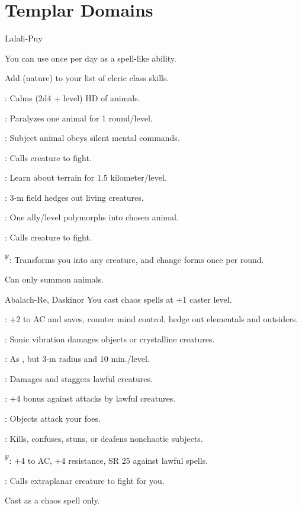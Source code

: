 \section{Templar Domains}

{Lalali-Puy}
{You can use  once per day as a spell-like ability.

Add  (nature) to your list of cleric class skills.}
{
	\item {}: Calms (2d4 + level) HD of animals.
	\item {}: Paralyzes one animal for 1 round/level.
	\item {}: Subject animal obeys silent mental commands.
	\item {}\footnotemark[1]: Calls creature to fight.
	\item {}: Learn about terrain for 1.5 kilometer/level.
	\item {}: 3-m field hedges out living creatures.
	\item {}: One ally/level polymorphs into chosen animal.
	\item {}\footnotemark[1]: Calls creature to fight.
	\item {}\textsuperscript{F}: Transforms you into any creature, and change forms once per round.
}
 Can only summon animals.


{Abalach-Re, Daskinor}
{You cast chaos spells at +1 caster level.}
{
	\item {}: +2 to AC and saves, counter mind control, hedge out elementals and outsiders.
	\item {}: Sonic vibration damages objects or crystalline creatures.
	\item {}: As , but 3-m radius and 10 min./level.
	\item {}: Damages and staggers lawful creatures.
	\item {}: +4 bonus against attacks by lawful creatures.
	\item {}: Objects attack your foes.
	\item {}: Kills, confuses, stuns, or deafens nonchaotic subjects.
	\item {}\textsuperscript{F}: +4 to AC, +4 resistance, SR 25 against lawful spells.
	\item {}\footnotemark[1]: Calls extraplanar creature to fight for you.
}
 Cast as a chaos spell only.

